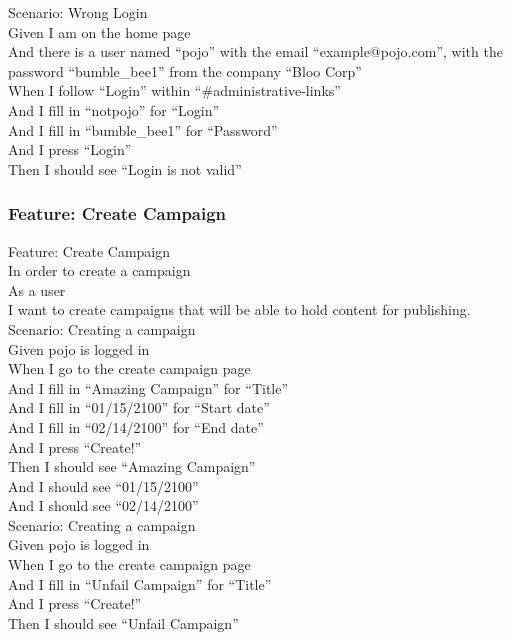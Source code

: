 \documentclass[12pt]{article}
\begin{document}
Scenario: Wrong Login \\
  Given I am on the home page \\
  And there is a user named ``pojo'' with the email ``example@pojo.com'', with the password ``bumble\_bee1'' from the company ``Bloo Corp'' \\
  When I follow ``Login'' within ``\#administrative-links'' \\
  And I fill in ``notpojo'' for ``Login'' \\
  And I fill in ``bumble\_bee1'' for ``Password'' \\
  And I press ``Login'' \\
  Then I should see ``Login is not valid'' \\

\subsubsection{Feature: Create Campaign}

Feature: Create Campaign \\
  In order to create a campaign \\
  As a user \\
  I want to create campaigns that will be able to hold content for publishing. \\
  
Scenario: Creating a campaign \\
  Given pojo is logged in \\
  When I go to the create campaign page \\
  And I fill in ``Amazing Campaign'' for ``Title'' \\
  And I fill in ``01/15/2100'' for ``Start date'' \\
  And I fill in ``02/14/2100'' for ``End date''   \\
  And I press ``Create!'' \\
  Then I should see ``Amazing Campaign'' \\
  And I should see ``01/15/2100'' \\
  And I should see ``02/14/2100'' \\

Scenario: Creating a campaign \\
  Given pojo is logged in \\
  When I go to the create campaign page \\
  And I fill in ``Unfail Campaign'' for ``Title'' \\
  And I press ``Create!'' \\
  Then I should see ``Unfail Campaign'' \\
\end{document}
